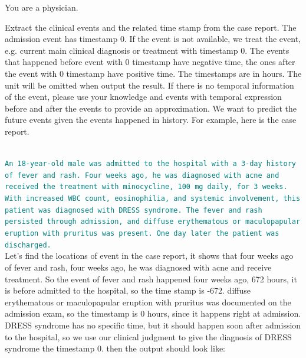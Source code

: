 \begin{minipage}[!htbp]{0.99\textwidth}
\begin{tcolorbox}[colback=gray!5, colframe=gray!100, title=Prompt, boxrule=2pt]

{You are a physician. 

Extract the clinical events and the related time stamp from the case report. The admission event has timestamp 0. If the event is not available, we treat the event, e.g. current main clinical diagnosis or treatment with timestamp 0. The events that happened before event with 0 timestamp have negative time, the ones after the event with 0 timestamp have positive time. The timestamps are in hours. The unit will be omitted when output the result. If there is no temporal information of the event, please use your knowledge and events with temporal expression before and after the events to provide an approximation. We want to predict the future events given the events happened in history. For example, here is the case report.}\\

\noindent
\textcolor{teal}{\texttt{An 18-year-old male was admitted to the hospital with a 3-day history of fever and rash. Four weeks ago, he was diagnosed with acne and received the treatment with minocycline, 100 mg daily, for 3 weeks. With increased WBC count, eosinophilia, and systemic involvement, this patient was diagnosed with DRESS syndrome. The fever and rash persisted through admission, and diffuse erythematous or maculopapular eruption with pruritus was present. One day later the patient was discharged.}}\\

\noindent
{Let's find the locations of event in the case report, it shows that four weeks ago of fever and rash, four weeks ago, he was diagnosed with acne and receive treatment. So the event of fever and rash happened four weeks ago, 672 hours, it is before admitted to the hospital, so the time stamp is -672. diffuse erythematous or maculopapular eruption with pruritus was documented on the admission exam, so the timestamp is 0 hours, since it happens right at admission. DRESS syndrome has no specific time, but it should happen soon after admission to the hospital, so we use our clinical judgment to give the diagnosis of DRESS syndrome the timestamp 0. then the output should look like:}\\
\vspace{2mm}
\noindent 


\end{tcolorbox}
\end{minipage}
